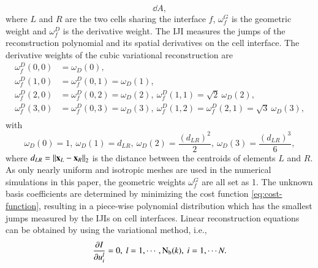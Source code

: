 {\begin{equation}
{        \dd A
    },
\end{equation}
where $L$ and $R$ are the two cells sharing the interface $f$, $\omega_f^G$ is the geometric weight and $\omega_f^D$ is the derivative weight.
The IJI measures the jumps of the reconstruction polynomial and its spatial derivatives on the cell interface.
The derivative weights of the cubic variational reconstruction are
\begin{equation}
    \begin{aligned}
        \omega_f^D(0,0) & = \omega_D(0),                                                                               \\
        \omega_f^D(1,0) & = \omega_f^D(0,1) = \omega_D(1) ,                                                            \\
        \omega_f^D(2,0) & = \omega_f^D(0,2) = \omega_D(2),\ \omega_f^D(1,1) = \sqrt{2}\ \omega_D(2)  ,                 \\
        \omega_f^D(3,0) & = \omega_f^D(0,3) = \omega_D(3),\ \omega_f^D(1,2) = \omega_f^D(2,1) = \sqrt{3}\ \omega_D(3), \\
    \end{aligned}
    \label{eq:wdRotRatio}
\end{equation}
with
\begin{equation}
    \omega_D(0) = 1, \ \omega_D(1) = d_{LR}, \ \omega_D(2) = \frac{\left(d_{LR}\right)^2}{2}, \ \omega_D(3) = \frac{\left(d_{LR}\right)^3}{6},
    \label{eq:wdHQMOPT}
\end{equation}
where $d_{LR}= \left\| \mathbf{x}_L -\mathbf{x}_R \right\|_2$ is the distance between the centroids of elements $L$ and $R$.
As only nearly uniform and isotropic meshes are used in the numerical simulations in this paper,
the geometric weights
$\omega^G_f$ are all set as 1.}
The unknown basis coefficients are determined by minimizing the cost function \eqref{eq:cost-function}, resulting in a  piece-wise polynomial distribution which has the smallest jumps measured by the IJIs on cell interfaces.
Linear reconstruction equations can be obtained by using the variational method, i.e.,
\begin{equation}
    \label{eq:minimization}
    \partialderivative{I}{u_i^l} = 0, \ l=1,\cdots, \mathrm{N_b}(k),\  i=1,\cdots N.
\end{equation}
